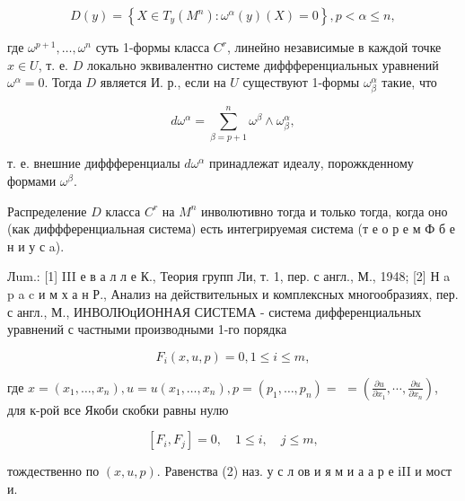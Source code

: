 \documentclass[10pt]{article}
\begin{document}
\[

D(y)=\left\{X \in T_{y}\left(M^{n}\right): \omega^{\alpha}(y)(X)=0\right\}, p<\alpha \leqslant n,

\]



где $\omega^{p+1}, \ldots, \omega^{n}$ суть 1-формы класса $C^{r}$, линейно независимые в каждой точке $x \in U$, т. е. $D$ локально эквивалентно системе диффференциальных уравнений $\omega^{\alpha}=0$. Тогда $D$ является И. р., если на $U$ существуют 1-формы $\omega_{\beta}^{\alpha}$ такие, что



\[

d \omega^{\alpha}=\sum_{\beta=p+1}^{n} \omega^{\beta} \wedge \omega_{\beta}^{\alpha},

\]



т. е. внешние диффференциалы $d \omega^{\alpha}$ принадлежат идеалу, порожкденному формами $\omega^{\beta}$.



Распределение $D$ класса $C^{r}$ на $M^{n}$ инволютивно тогда и только тогда, когда оно (как диффференциальная система) есть интегрируемая система (т е о р е м Ф б е н и у с a).



Лum.: [1] III е в а л л е К., Теория групп Ли, т. 1, пер. с англ., М., 1948; [2] Н a p a c и м х а н Р., Анализ на действительных и комплексных многообразиях, пер. с англ., М., ИНВОЛЮцИОННАЯ СИСТЕМА - система дифференциальных уравнений с частными производными 1-го порядка



\[

F_{i}(x, u, p)=0,1 \leqslant i \leqslant m,

\]



где $x=\left(x_{1}, \ldots, x_{n}\right), u=u\left(x_{1}, \ldots, x_{n}\right), p=\left(p_{1}, \ldots, p_{n}\right)=$ $=\left(\frac{\partial u}{\partial x_{1}}, \cdots, \frac{\partial u}{\partial x_{n}}\right)$, для к-рой все Якоби скобки равны нулю



\[

\left[F_{i}, F_{j}\right]=0, \quad 1 \leqslant i, \quad j \leqslant m,

\]



тождественно по $(x, u, p)$. Равенства (2) наз. у с л ов и я м и а $а$ р е іII и мост и.
\end{document}
